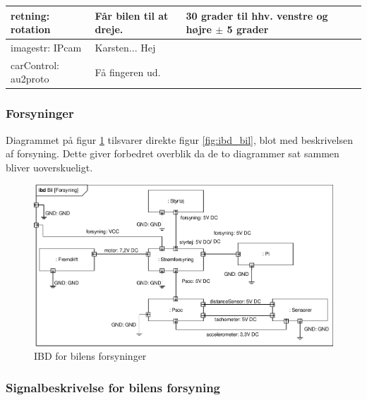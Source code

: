 \begin{table}[h]
\begin{tabularx}{\textwidth}{|l|Z|Z|Z|}
retning: rotation
	& Får bilen til at dreje.
	& 30 grader til hhv. venstre og højre $\pm$ 5 grader
	& ~
	\\ \hline
	
imagestr: IPcam
	& Karsten... Hej%
	& ~ 
	& ~
	\\ \hline

carControl: au2proto
	& Få fingeren ud. %
	& ~
	& ~
	\\ \hline

	\end{tabularx}
	\label{tbl:bil_signaler}
\end{table}

\clearpage

\subsubsection{Forsyninger} %

Diagrammet på figur \ref{fig:ibd_bil_forsyning} tilsvarer direkte figur \ref{fig:ibd_bil}, blot med beskrivelsen af forsyning. Dette giver forbedret overblik da de to diagrammer sat sammen bliver uoverskueligt.  

\begin{figure}[h]
\centering
\includegraphics[width=\textwidth]{../fig/diagrammer/bil/ibd_bil_forsyning.pdf}
\caption{IBD for bilens forsyninger}
\label{fig:ibd_bil_forsyning}
\end{figure}

\clearpage

\subsubsection{Signalbeskrivelse for bilens forsyning}

